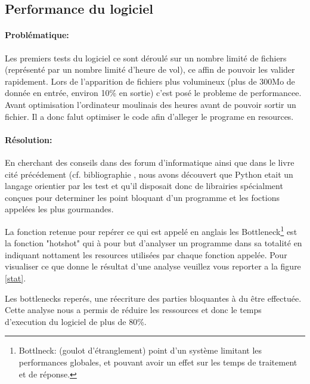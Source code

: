     \subsection{Performance du logiciel\label{perf}}
            \paragraph{Problématique:}
Les premiers tests du logiciel ce sont déroulé sur un nombre limité de fichiers (représenté par un nombre limité d'heure de vol), ce affin de pouvoir les valider rapidement. Lors de l'apparition de fichiers plus volumineux (plus de 300Mo de donnée en entrée, environ 10\% en sortie) c'est posé le probleme de performancee. Avant optimisation l'ordinateur moulinais des heures avant de pouvoir sortir un fichier. Il a donc falut optimiser le code afin d'alleger le programe en resources.

            \paragraph{Résolution:}
En cherchant des conseils dans des forum d'informatique ainsi que dans le livre cité précédement (cf. bibliographie \cite{pybook}, nous avons découvert que Python etait un langage orientier par les test et qu'il disposait donc de librairies spécialment conçues pour determiner les point bloquant d'un programme et les foctions appelées les plus gourmandes.

La fonction retenue pour repérer ce qui est appelé en anglais les Bottleneck\footnote{Bottlneck: (goulot d'étranglement) point d'un système limitant les performances globales, et pouvant avoir un effet sur les temps de traitement et de réponse.} est la fonction "hotshot" qui à pour but d'analyser un programme dans sa totalité en indiquant nottament les resources utilisées par chaque fonction appelée. Pour visualiser ce que donne le résultat d'une analyse veuillez vous reporter a la figure \vref{stat}.

Les bottlenecks reperés, une réecriture des parties bloquantes à du être effectuée. Cette analyse nous a permis de réduire les ressources et donc le temps d'execution du logiciel de plus de 80\%.
